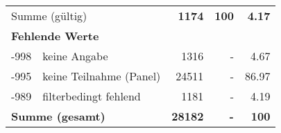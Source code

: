 \begin{longtable}{lXrrr}
     \midrule
     \multicolumn{2}{l}{Summe (gültig)} &
       \textbf{\num{1174}} &
     \textbf{100} &
       \textbf{\num[round-mode=places,round-precision=2]{4,17}} \\
     \multicolumn{5}{l}{\textbf{Fehlende Werte}}\\
       -998 &
       keine Angabe &
         \num{1316} &
        - &
         \num[round-mode=places,round-precision=2]{4,67} \\
       -995 &
       keine Teilnahme (Panel) &
         \num{24511} &
        - &
         \num[round-mode=places,round-precision=2]{86,97} \\
       -989 &
       filterbedingt fehlend &
         \num{1181} &
        - &
         \num[round-mode=places,round-precision=2]{4,19} \\
     \midrule
     \multicolumn{2}{l}{\textbf{Summe (gesamt)}} &
          \textbf{\num{28182}} &
        \textbf{-} &
        \textbf{100} \\
     \bottomrule
     \end{longtable}
     
